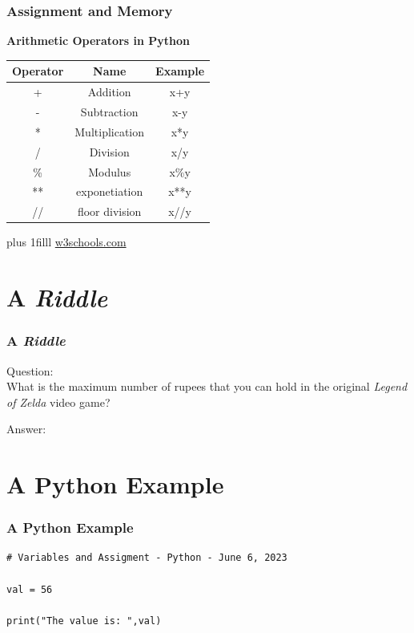 \documentclass[fleqn]{beamer} %
\newcommand{\sectiontitleIII}{Assignment and Memory}
\newcommand{\sectiontitleIV}{A {\it Riddle} }
\newcommand{\sectiontitleV}{A Python Example }
\newcommand{\btVFill}{\vskip0pt plus 1filll}
\begin{document}
	\begin{frame}[containsverbatim] \small
	\frametitle{\sectiontitleIII}

	\textbf{Arithmetic Operators in Python} \vspace{5mm} \\

	\renewcommand*{\arraystretch}{1.5}
	\begin{tabular}{|c|c|c|} \hline
		\textbf{Operator}& \textbf{Name}& \textbf{Example} \\ \hline
		+ & Addition& x+y \\ \hline
        - & Subtraction& x-y \\ \hline
        * & Multiplication& x*y \\ \hline
        / & Division& x/y \\ \hline
        \% & Modulus & x\%y \\ \hline
        ** & exponetiation & x**y \\ \hline
        // & floor division& x//y \\ \hline 
	\end{tabular}
	
	\btVFill
	{\tiny \href{https://www.w3schools.com/python/gloss_python_arithmetic_operators.asp}{w3schools.com}}
	\end{frame}
	


\section{\sectiontitleIV}	
	\begin{frame}[label=sectionIV] \small
		\frametitle{\sectiontitleIV}    
		
		Question: \vspace{5mm}\\ What is the maximum number of rupees that you can hold in the original {\it Legend of Zelda} video game? 
		\vspace{25mm}
		
		Answer:

	\end{frame}

\section{\sectiontitleV}	
	\begin{frame}[label=sectionV,containsverbatim] \small
		\frametitle{\sectiontitleV}    
		
		\begin{lstlisting}
# Variables and Assigment - Python - June 6, 2023

val = 56 
	
print("The value is: ",val)
	
\end{lstlisting}

	\end{frame}
\end{document}

